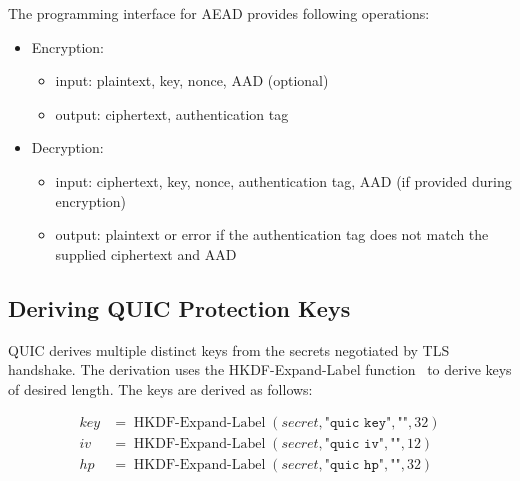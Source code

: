 The programming interface for AEAD provides following operations:

\begin{itemize}

  \item Encryption:

  \begin{itemize}

    \item input: plaintext, key, nonce, AAD (optional)

    \item output: ciphertext, authentication tag

  \end{itemize}

  \item Decryption:

  \begin{itemize}

    \item input: ciphertext, key, nonce, authentication tag, AAD (if provided during encryption)

    \item output: plaintext or error if the authentication tag does not match the supplied
      ciphertext and AAD

  \end{itemize}

\end{itemize}

\subsection{Deriving QUIC Protection Keys}

QUIC derives multiple distinct keys from the secrets negotiated by TLS handshake. The derivation
uses the HKDF-Expand-Label function~\cite{rfc5869} to derive keys of desired length. The keys are
derived as follows:

\begin{equation*}
  \begin{split}
  key & = \operatorname{HKDF-Expand-Label}(secret, \texttt{"quic key"}, \texttt{""}, 32) \\
  iv  & = \operatorname{HKDF-Expand-Label}(secret, \texttt{"quic iv"}, \texttt{""}, 12)  \\
  hp  & = \operatorname{HKDF-Expand-Label}(secret, \texttt{"quic hp"}, \texttt{""}, 32)  \\
  \end{split}
\end{equation*}

